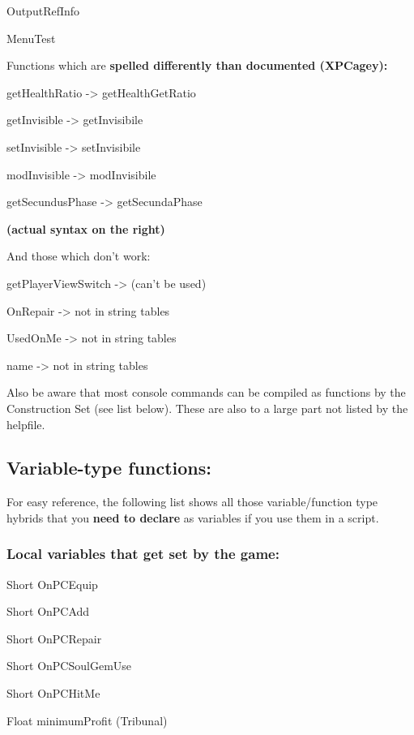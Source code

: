 \documentclass[
]{article}
\begin{document}
OutputRefInfo

MenuTest

Functions which are \textbf{spelled differently than documented
(XPCagey):}

getHealthRatio -\textgreater{} getHealthGetRatio

getInvisible -\textgreater{} getInvisibile

setInvisible -\textgreater{} setInvisibile

modInvisible -\textgreater{} modInvisibile

getSecundusPhase -\textgreater{} getSecundaPhase

\textbf{(actual syntax on the right)}

And those which don't work:

getPlayerViewSwitch -\textgreater{} (can't be used)

OnRepair -\textgreater{} not in string tables

UsedOnMe -\textgreater{} not in string tables

name -\textgreater{} not in string tables

Also be aware that most console commands can be compiled as functions by
the Construction Set (see list below). These are also to a large part
not listed by the helpfile.

\hypertarget{variable-type-functions}{%
\subsection{\texorpdfstring{\hfill\break
Variable-type
functions:}{ Variable-type functions:}}\label{variable-type-functions}}

For easy reference, the following list shows all those variable/function
type hybrids that you \textbf{need to declare} as variables if you use
them in a script.

\hypertarget{local-variables-that-get-set-by-the-game}{%
\subsubsection{Local variables that get set by the
game:}\label{local-variables-that-get-set-by-the-game}}

Short OnPCEquip

Short OnPCAdd

Short OnPCRepair

Short OnPCSoulGemUse

Short OnPCHitMe

Float minimumProfit (Tribunal)
\end{document}
